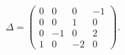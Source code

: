 \begin{equation}\Delta= \left(
 \begin{array}{cccc}
 0&0&0&-1 \\0&0&1&0 \\0&-1&0&2 \\ 1&0&-2&0
 \end{array}\right).
 \label{a63}
 \end{equation}

